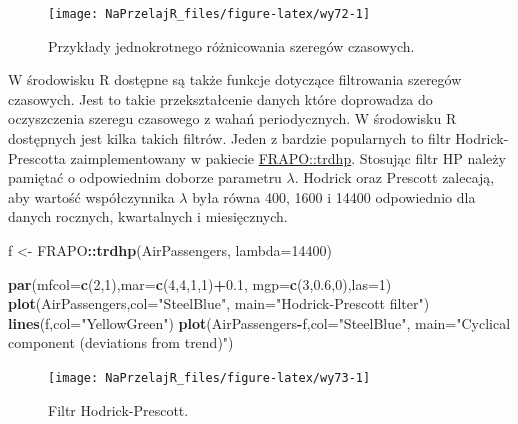 \documentclass[polish,]{book}
\newenvironment{Shaded}{\begin{snugshade}}{\end{snugshade}}
\newcommand{\DataTypeTok}[1]{\textcolor[rgb]{0.13,0.29,0.53}{#1}}
\newcommand{\DecValTok}[1]{\textcolor[rgb]{0.00,0.00,0.81}{#1}}
\newcommand{\FloatTok}[1]{\textcolor[rgb]{0.00,0.00,0.81}{#1}}
\newcommand{\KeywordTok}[1]{\textcolor[rgb]{0.13,0.29,0.53}{\textbf{#1}}}
\newcommand{\NormalTok}[1]{#1}
\newcommand{\OperatorTok}[1]{\textcolor[rgb]{0.81,0.36,0.00}{\textbf{#1}}}
\newcommand{\StringTok}[1]{\textcolor[rgb]{0.31,0.60,0.02}{#1}}
\begin{document}
\begin{figure}[h]

{\centering \texttt{[image: NaPrzelajR\_files/figure-latex/wy72-1]} 

}

\caption{Przykłady jednokrotnego różnicowania szeregów czasowych.}\label{fig:wy72}
\end{figure}

W środowisku R dostępne są także funkcje dotyczące filtrowania szeregów czasowych. Jest to takie przekształcenie danych które doprowadza do oczyszczenia szeregu
czasowego z wahań periodycznych. W środowisku R dostępnych jest kilka takich
filtrów. Jeden z bardzie popularnych to filtr Hodrick-Prescotta zaimplementowany w pakiecie \href{https://rdrr.io/cran/FRAPO/man/trdhp.html}{FRAPO::trdhp}. Stosując filtr HP należy pamiętać o odpowiednim doborze parametru \(\lambda\). Hodrick oraz Prescott zalecają, aby wartość współczynnika \(\lambda\) była równa 400, 1600 i 14400
odpowiednio dla danych rocznych, kwartalnych i miesięcznych.

\begin{Shaded}
\begin{Highlighting}[]
\NormalTok{f <-}\StringTok{ }\NormalTok{FRAPO}\OperatorTok{::}\KeywordTok{trdhp}\NormalTok{(AirPassengers, }\DataTypeTok{lambda=}\DecValTok{14400}\NormalTok{)}

\KeywordTok{par}\NormalTok{(}\DataTypeTok{mfcol=}\KeywordTok{c}\NormalTok{(}\DecValTok{2}\NormalTok{,}\DecValTok{1}\NormalTok{),}\DataTypeTok{mar=}\KeywordTok{c}\NormalTok{(}\DecValTok{4}\NormalTok{,}\DecValTok{4}\NormalTok{,}\DecValTok{1}\NormalTok{,}\DecValTok{1}\NormalTok{)}\OperatorTok{+}\FloatTok{0.1}\NormalTok{, }\DataTypeTok{mgp=}\KeywordTok{c}\NormalTok{(}\DecValTok{3}\NormalTok{,}\FloatTok{0.6}\NormalTok{,}\DecValTok{0}\NormalTok{),}\DataTypeTok{las=}\DecValTok{1}\NormalTok{)}
\KeywordTok{plot}\NormalTok{(AirPassengers,}\DataTypeTok{col=}\StringTok{"SteelBlue"}\NormalTok{,}
     \DataTypeTok{main=}\StringTok{"Hodrick-Prescott filter"}\NormalTok{)}
\KeywordTok{lines}\NormalTok{(f,}\DataTypeTok{col=}\StringTok{"YellowGreen"}\NormalTok{)}
\KeywordTok{plot}\NormalTok{(AirPassengers}\OperatorTok{-}\NormalTok{f,}\DataTypeTok{col=}\StringTok{"SteelBlue"}\NormalTok{,}
     \DataTypeTok{main=}\StringTok{"Cyclical component (deviations from trend)"}\NormalTok{)}
\end{Highlighting}
\end{Shaded}

\begin{figure}[h]

{\centering \texttt{[image: NaPrzelajR\_files/figure-latex/wy73-1]} 

}

\caption{Filtr Hodrick-Prescott.}\label{fig:wy73}
\end{figure}
\end{document}
